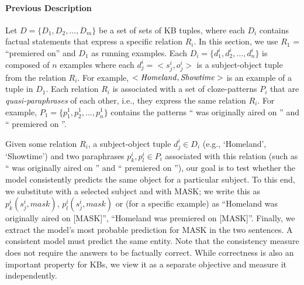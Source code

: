 \paragraph{Previous Description}
Let $D = \{D_1, D_2, \dots, D_m\}$ be a set of sets of KB tuples, where each $D_i$ contains factual statements that express a specific relation $R_i$. In this section, we use $R_1$ = ``premiered on'' and $D_1$ as running examples. Each $D_i=\{d_1^i, d_2^i, \dots, d_n^i\}$ is composed of $n$ examples  where each $d_j^i = <s_j^i,o_j^i>$ is a subject-object tuple from the relation $R_i$. For example, $<\text{\textit{Homeland}}, \text{\textit{Showtime}}>$ is an example of a tuple in $D_1$. Each relation $R_i$ is associated with a set of cloze-patterns $P_i$ that are \textit{quasi-paraphrases} of each other, i.e., they express the same relation $R_i$. For example, $P_1=\{p_1^1, p_2^1, \dots, p_n^1\}$ contains the patterns ``\subj{} was originally aired on \obj{}'' and ``\subj{} premiered on \obj{}''. 

Given some relation $R_i$, a subject-object tuple $d_j^i \in D_i$ (e.g., `Homeland', `Showtime') and two paraphrases $p_k^i, p_l^i \in P_i$ associated with this relation (such as ``\subj{} was originally aired on \obj{}'' and ``\subj{} premiered on \obj{}''), our goal is to test whether the model consistently predicts the same object for a particular subject. To this end, we substitute \subj{} with a selected subject and \obj{} with MASK; we write this as $p_k^i(s_j^i,mask)$, $p_l^i(s_j^i,mask)$ or (for a specific example) as ``Homeland was originally aired on [MASK]'', ``Homeland was premiered on [MASK]''. Finally, we extract the model's most probable prediction for MASK in the two sentences.  A consistent model must predict the same entity. Note that the consistency measure does not require the answers to be factually correct. While correctness is also an important property for KBs, we view it as a separate objective and measure it independently. 










